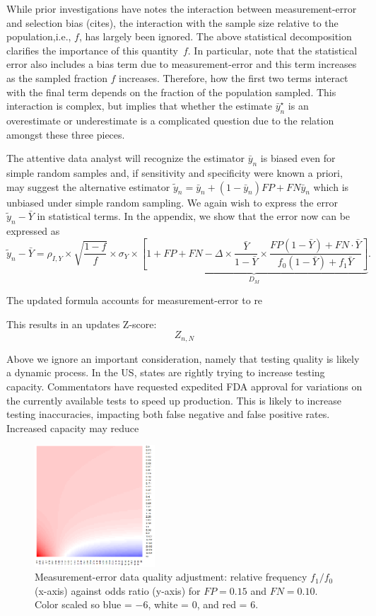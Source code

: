 \documentclass[11pt]{article}
\numberwithin{equation}{section}
\theoremstyle{plain}
\begin{document}
While prior investigations have notes the interaction between measurement-error and selection bias (cites), the interaction with the sample size relative to the population,i.e., $f$, has largely been ignored.  The above statistical decomposition clarifies the importance of this quantity~$f$.  In particular, note that the statistical error also includes a bias term due to measurement-error and this term increases as the sampled fraction $f$ increases. Therefore, how the first two terms interact with the final term depends on the fraction of the population sampled.  This interaction is complex, but implies that whether the estimate $\bar y^\star_n$ is an overestimate or underestimate is a complicated question due to the relation amongst these three pieces.

The attentive data analyst will recognize the estimator $\bar y_n$ is biased even for simple random samples and, if sensitivity and specificity were known a priori, may suggest the alternative estimator $\tilde y_n = \bar y_n + (1-\bar y_n) FP + FN \bar y_n$ which is unbiased under simple random sampling. We again wish to express the error $\tilde  y_n - \bar Y$ in statistical terms. In the appendix, we show that the error now can be expressed as
$$
\tilde y_n - \bar Y = \rho_{I,Y} \times \sqrt{\frac{1-f}{f}} \times \sigma_{Y}
\times \underbrace{\left[ 1 + FP + FN - \Delta \times \frac{\bar Y}{1-\bar Y} \times \frac{FP(1-\bar Y) + FN \cdot \bar Y}{f_0 (1-\bar Y) + f_1 \bar Y} \right]}_{D_M}.
$$

The updated formula accounts for measurement-error to re

This results in an updates Z-score:
$$
Z_{n,N}
$$

Above we ignore an important consideration, namely that testing quality is likely a dynamic process.  In the US, states are rightly trying to increase testing capacity.  Commentators have requested expedited FDA approval for variations on the currently available tests to speed up production.  This is likely to increase testing inaccuracies, impacting both false negative and false positive rates.  Increased capacity may reduce

\begin{figure}
\centering
\includegraphics[width = 0.4\textwidth]{../methods/figs/mem_heatmap_article.png}
\caption{Measurement-error data quality adjustment: relative frequency $f_1/f_0$ (x-axis) against odds ratio (y-axis) for $FP=0.15$ and $FN=0.10$. Color scaled so blue = $-6$, white = 0, and red = $6$.}
\end{figure}
\end{document}
